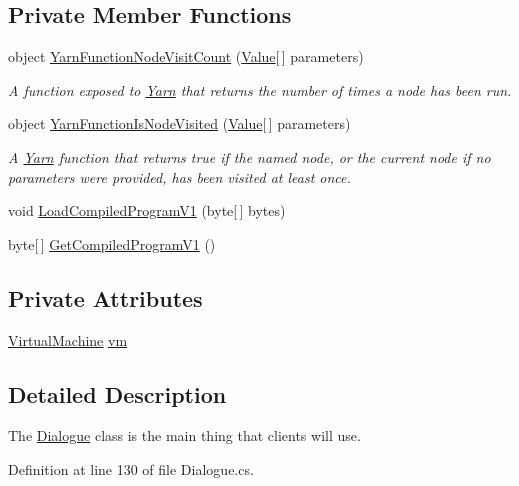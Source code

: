 \subsection*{Private Member Functions}
\begin{DoxyCompactItemize}
\item 
object \hyperlink{a00092_a10c9f22d3f55e74f091cd6069c431094}{Yarn\-Function\-Node\-Visit\-Count} (\hyperlink{a00187}{Value}\mbox{[}$\,$\mbox{]} parameters)
\begin{DoxyCompactList}\small\item\em A function exposed to \hyperlink{a00051}{Yarn} that returns the number of times a node has been run. \end{DoxyCompactList}\item 
object \hyperlink{a00092_a1ab129bd84381928531d503304ca08d6}{Yarn\-Function\-Is\-Node\-Visited} (\hyperlink{a00187}{Value}\mbox{[}$\,$\mbox{]} parameters)
\begin{DoxyCompactList}\small\item\em A \hyperlink{a00051}{Yarn} function that returns true if the named node, or the current node if no parameters were provided, has been visited at least once. \end{DoxyCompactList}\item 
void \hyperlink{a00092_a706df08e842c2419f7a66fd40c0a544f}{Load\-Compiled\-Program\-V1} (byte\mbox{[}$\,$\mbox{]} bytes)
\item 
byte\mbox{[}$\,$\mbox{]} \hyperlink{a00092_a070898dbc07fd7d0a74d7c3ac1848beb}{Get\-Compiled\-Program\-V1} ()
\end{DoxyCompactItemize}
\subsection*{Private Attributes}
\begin{DoxyCompactItemize}
\item 
\hyperlink{a00162}{Virtual\-Machine} \hyperlink{a00092_a8c1319357a9df6cff051328fb33224c7}{vm}
\end{DoxyCompactItemize}


\subsection{Detailed Description}
The \hyperlink{a00092}{Dialogue} class is the main thing that clients will use. 

Definition at line 130 of file Dialogue.\-cs.



